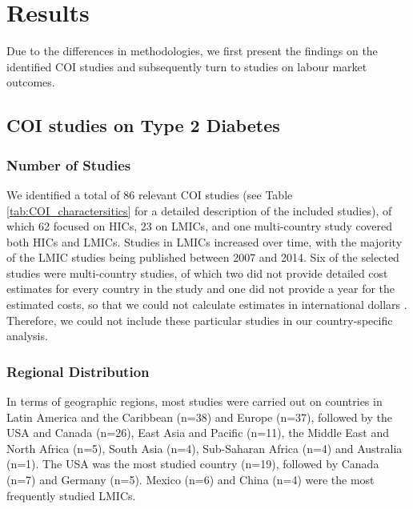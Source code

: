 \documentclass[12pt,english]{article}
\begin{document}
\section{Results}
Due to the differences in methodologies, we first present the findings on the identified \ac{COI} studies and subsequently turn to studies on labour market outcomes.

\subsection{\ac{COI} studies on Type 2 Diabetes}

\subsubsection{Number of Studies}
We identified a total of 86 relevant \ac{COI} studies (see Table \ref{tab:COI_charactersitics} for a detailed description of the included studies), of which 62 focused on \acp{HIC}, 23 on \acp{LMIC}, and one multi-country study covered both \acp{HIC} and \acp{LMIC}. Studies in \acp{LMIC} increased over time, with the majority of the \ac{LMIC} studies being published between 2007 and 2014. Six of the selected studies were multi-country studies, of which two \parencite{Kirigia2009,Smith-Spangler2012} did not provide detailed cost estimates for every country in the study and one did not provide a year for the estimated costs, so that we could not calculate estimates in international dollars \parencite{Boutayeb2014}. Therefore, we could not include these particular studies in our country-specific analysis.

\subsubsection{Regional Distribution}
In terms of geographic regions, most studies were carried out on countries in Latin America and the Caribbean (n=38) and Europe (n=37), followed by the USA and Canada (n=26), East Asia and Pacific (n=11), the Middle East and North Africa (n=5), South Asia (n=4), Sub-Saharan Africa (n=4) and Australia (n=1). The USA was the most studied country (n=19), followed by Canada (n=7) and Germany (n=5). Mexico (n=6) and China (n=4) were the most frequently studied \acp{LMIC}.
\end{document}
